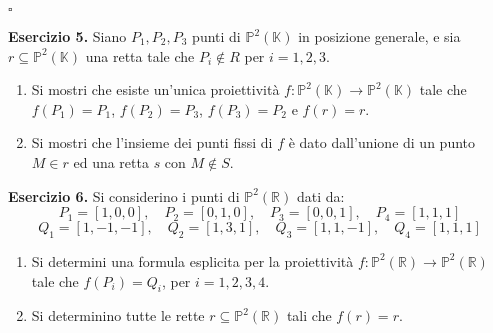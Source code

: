 \documentclass[12pt]{article}
\theoremstyle{remark}
\theoremstyle{definition}
\newcommand{\RR}{\mathbb{R}}
\newcommand{\PP}{\mathbb{P}}
\newcommand{\KK}{\mathbb{K}}
\begin{document}
\hfill $\square$


\begin{center}
  \date{\large\textsc{Esercizi II settimana}}
\end{center}

\noindent \textbf{Esercizio 5.} Siano $P_1,P_2,P_3$ punti di $\PP^2(\KK)$ in posizione generale, e sia $r \subseteq \PP^2(\KK)$ una retta tale che $P_i \not \in R$ per $i = 1,2,3$.
\vspace{-2mm}
\begin{enumerate}[(1)]
  \item Si mostri che esiste un'unica proiettività $f : \PP^2(\KK) \longrightarrow \PP^2(\KK)$ tale che $f(P_1) = P_1$, $f(P_2) = P_3$, $f(P_3) = P_2$ e $f(r) = r$.
  \item Si mostri che l'insieme dei punti fissi di $f$ è dato dall'unione di un punto $M \in r$ ed una retta $s$ con $M \not \in S$.
\end{enumerate}

\noindent \textbf{Esercizio 6.} Si considerino i punti di $\PP^2(\RR)$ dati da:
\[ P_1 = [1,0,0], \quad P_2 = [0,1,0], \quad P_3 = [0,0,1], \quad P_4 = [1,1,1]
  \]\[ Q_1 = [1,-1,-1], \quad Q_2 = [1,3,1], \quad Q_3 = [1,1,-1], \quad Q_4 = [1,1,1]
    \]
\vspace{-2mm}
\begin{enumerate}[(1)]
  \item Si determini una formula esplicita per la proiettività $f : \PP^2(\RR) \longrightarrow \PP^2(\RR)$ tale che $f(P_i) = Q_i$, per $i = 1,2,3,4$.
  \item Si determinino tutte le rette $r \subseteq \PP^2(\RR)$ tali che $f(r) = r$.
\end{enumerate}
\end{document}
